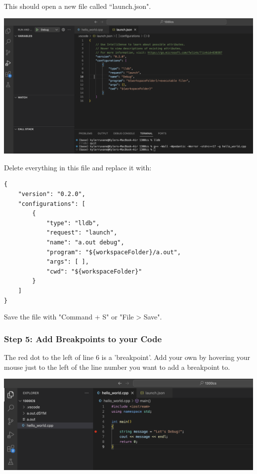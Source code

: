 This should open a new file called ``launch.json".

\includegraphics[width=\textwidth]{images/macDebuggerSetup/debugger_mac_5.png}

Delete everything in this file and replace it with:

\begin{verbatim}
{
    "version": "0.2.0",
    "configurations": [
        {
            "type": "lldb",
            "request": "launch",
            "name": "a.out debug",
            "program": "${workspaceFolder}/a.out",
            "args": [ ],
            "cwd": "${workspaceFolder}"
        }
    ]
}
\end{verbatim}

Save the file with "Command + S" or "File > Save".

\subsubsection{Step 5: Add Breakpoints to your Code}

The red dot to the left of line 6 is a 'breakpoint'. Add your own by hovering your mouse just to the left of the line number you want to add a breakpoint to.

\includegraphics[width=\textwidth]{images/macDebuggerSetup/debugger_mac_6.png}

